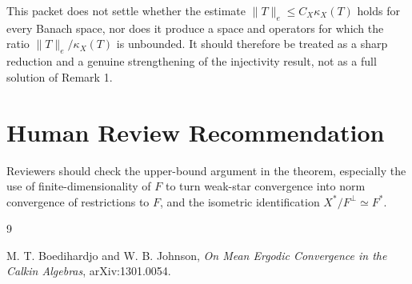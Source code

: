 \documentclass[11pt]{article}
\begin{document}
This packet does not settle whether the estimate
\(\|T\|_e\le C_X\kappa_X(T)\) holds for every Banach space, nor does it produce
a space and operators for which the ratio \(\|T\|_e/\kappa_X(T)\) is
unbounded.  It should therefore be treated as a sharp reduction and a genuine
strengthening of the injectivity result, not as a full solution of Remark 1.

\section*{Human Review Recommendation}

Reviewers should check the upper-bound argument in the theorem, especially the
use of finite-dimensionality of \(F\) to turn weak-star convergence into norm
convergence of restrictions to \(F\), and the isometric identification
\(X^*/F^\perp\simeq F^*\).

\begin{thebibliography}{9}

M. T. Boedihardjo and W. B. Johnson,
\emph{On Mean Ergodic Convergence in the Calkin Algebras},
arXiv:1301.0054.

\end{thebibliography}
\end{document}
